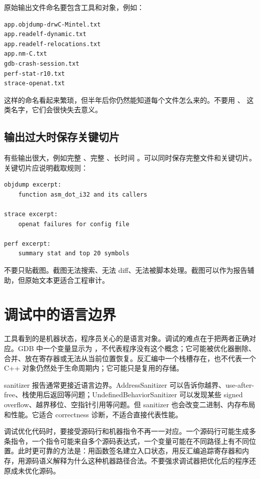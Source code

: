 原始输出文件命名要包含工具和对象，例如：

\begin{lstlisting}
app.objdump-drwC-Mintel.txt
app.readelf-dynamic.txt
app.readelf-relocations.txt
app.nm-C.txt
gdb-crash-session.txt
perf-stat-r10.txt
strace-openat.txt
\end{lstlisting}

这样的命名看起来繁琐，但半年后你仍然能知道每个文件怎么来的。不要用 、 这类名字，它们会很快失去意义。

\subsection{输出过大时保存关键切片}

有些输出很大，例如完整 、完整 、长时间 。可以同时保存完整文件和关键切片。关键切片应说明截取规则：

\begin{lstlisting}
objdump excerpt:
    function asm_dot_i32 and its callers

strace excerpt:
    openat failures for config file

perf excerpt:
    summary stat and top 20 symbols
\end{lstlisting}

不要只贴截图。截图无法搜索、无法 diff、无法被脚本处理。截图可以作为报告辅助，但原始文本更适合工程审计。

\section{调试中的语言边界}

工具看到的是机器状态，程序员关心的是语言对象。调试的难点在于把两者正确对应。GDB 中一个变量显示为 ，不代表程序没有这个概念；它可能被优化器删除、合并、放在寄存器或无法从当前位置恢复。反汇编中一个栈槽存在，也不代表一个 C++ 对象仍然处于生命周期内；它可能只是复用的存储。

sanitizer 报告通常更接近语言边界。AddressSanitizer 可以告诉你越界、use-after-free、栈使用后返回等问题；UndefinedBehaviorSanitizer 可以发现某些 signed overflow、越界移位、空指针引用等问题。但 sanitizer 也会改变二进制、内存布局和性能。它适合 correctness 诊断，不适合直接代表性能。

调试优化代码时，要接受源码行和机器指令不再一一对应。一个源码行可能生成多条指令，一个指令可能来自多个源码表达式，一个变量可能在不同路径上有不同位置。此时更可靠的方法是：用函数签名建立入口状态，用反汇编追踪寄存器和内存，用源码语义解释为什么这种机器路径合法。不要强求调试器把优化后的程序还原成未优化源码。

